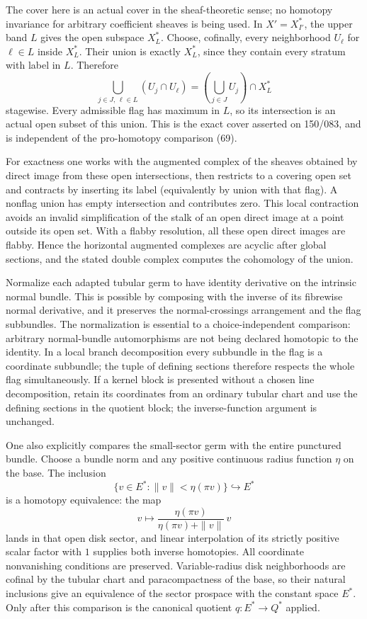 
The cover here is an actual cover in the sheaf-theoretic sense; no homotopy invariance for arbitrary coefficient sheaves is being used. In \(X'=X_{I'}^*\), the upper band \(L\) gives the open subspace \(X_L^*\). Choose, cofinally, every neighborhood \(U_\ell\) for \(\ell\in L\) inside \(X_L^*\). Their union is exactly \(X_L^*\), since they contain every stratum with label in \(L\). Therefore
\[
 \bigcup_{j\in J,\,\ell\in L}(U_j\cap U_\ell)
 =\left(\bigcup_{j\in J}U_j\right)\cap X_L^*
\]
stagewise. Every admissible flag has maximum in \(L\), so its intersection is an actual open subset of this union. This is the exact cover asserted on 150/083, and is independent of the pro-homotopy comparison (69).

For exactness one works with the augmented complex of the sheaves obtained by direct image from these open intersections, then restricts to a covering open set and contracts by inserting its label (equivalently by union with that flag). A nonflag union has empty intersection and contributes zero. This local contraction avoids an invalid simplification of the stalk of an open direct image at a point outside its open set. With a flabby resolution, all these open direct images are flabby. Hence the horizontal augmented complexes are acyclic after global sections, and the stated double complex computes the cohomology of the union.

Normalize each adapted tubular germ to have identity derivative on the intrinsic normal bundle. This is possible by composing with the inverse of its fibrewise normal derivative, and it preserves the normal-crossings arrangement and the flag subbundles. The normalization is essential to a choice-independent comparison: arbitrary normal-bundle automorphisms are not being declared homotopic to the identity. In a local branch decomposition every subbundle in the flag is a coordinate subbundle; the tuple of defining sections therefore respects the whole flag simultaneously. If a kernel block is presented without a chosen line decomposition, retain its coordinates from an ordinary tubular chart and use the defining sections in the quotient block; the inverse-function argument is unchanged.

One also explicitly compares the small-sector germ with the entire punctured bundle. Choose a bundle norm and any positive continuous radius function \(\eta\) on the base. The inclusion
\[
 \{v\in E^*:\|v\|<\eta(\pi v)\}\hookrightarrow E^*
\]
is a homotopy equivalence: the map
\[
 v\longmapsto
 \frac{\eta(\pi v)}{\eta(\pi v)+\|v\|}\,v
\]
lands in that open disk sector, and linear interpolation of its strictly positive scalar factor with \(1\) supplies both inverse homotopies. All coordinate nonvanishing conditions are preserved. Variable-radius disk neighborhoods are cofinal by the tubular chart and paracompactness of the base, so their natural inclusions give an equivalence of the sector prospace with the constant space \(E^*\). Only after this comparison is the canonical quotient \(q:E^*\to Q^*\) applied.
